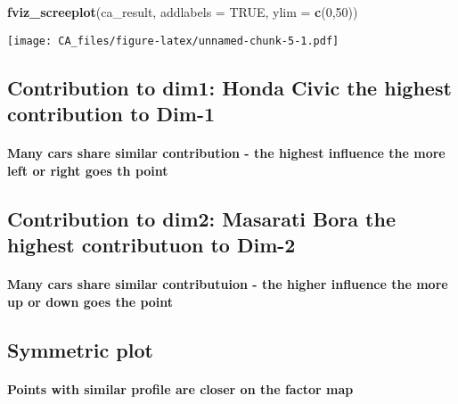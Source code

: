 \documentclass[]{article}
\newenvironment{Shaded}{\begin{snugshade}}{\end{snugshade}}
\newcommand{\KeywordTok}[1]{\textcolor[rgb]{0.13,0.29,0.53}{\textbf{#1}}}
\newcommand{\DataTypeTok}[1]{\textcolor[rgb]{0.13,0.29,0.53}{#1}}
\newcommand{\DecValTok}[1]{\textcolor[rgb]{0.00,0.00,0.81}{#1}}
\newcommand{\OtherTok}[1]{\textcolor[rgb]{0.56,0.35,0.01}{#1}}
\newcommand{\NormalTok}[1]{#1}
\let\oldparagraph\paragraph
\renewcommand{\paragraph}[1]{\oldparagraph{#1}\mbox{}}
\begin{document}
\begin{Shaded}
\begin{Highlighting}[]
\KeywordTok{fviz_screeplot}\NormalTok{(ca_result, }\DataTypeTok{addlabels =} \OtherTok{TRUE}\NormalTok{, }\DataTypeTok{ylim =} \KeywordTok{c}\NormalTok{(}\DecValTok{0}\NormalTok{,}\DecValTok{50}\NormalTok{))}
\end{Highlighting}
\end{Shaded}

\texttt{[image: CA\_files/figure-latex/unnamed-chunk-5-1.pdf]}

\subsection{Contribution to dim1: Honda Civic the highest contribution
to
Dim-1}\label{contribution-to-dim1-honda-civic-the-highest-contribution-to-dim-1}

\paragraph{Many cars share similar contribution - the highest influence
the more left or right goes th
point}\label{many-cars-share-similar-contribution---the-highest-influence-the-more-left-or-right-goes-th-point}

\subsection{Contribution to dim2: Masarati Bora the highest contributuon
to
Dim-2}\label{contribution-to-dim2-masarati-bora-the-highest-contributuon-to-dim-2}

\paragraph{Many cars share similar contributuion - the higher influence
the more up or down goes the
point}\label{many-cars-share-similar-contributuion---the-higher-influence-the-more-up-or-down-goes-the-point}

\subsection{Symmetric plot}\label{symmetric-plot}

\paragraph{Points with similar profile are closer on the factor
map}\label{points-with-similar-profile-are-closer-on-the-factor-map}
\end{document}

